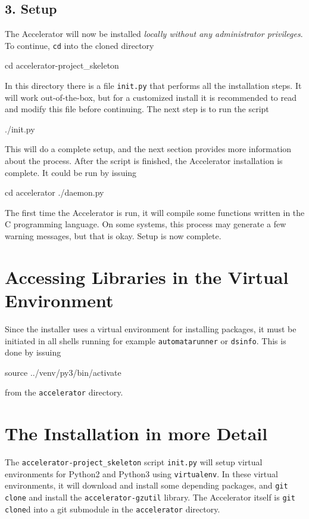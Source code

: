 \documentclass[a4paper]{article}
\begin{document}
\subsection*{3. Setup}
The Accelerator will now be installed \textsl{locally without any
  administrator privileges}.  To continue, \texttt{cd} into the cloned
directory
\begin{shell}
cd accelerator-project_skeleton
\end{shell}
In this directory there is a file \texttt{init.py} that performs all
the installation steps.  It will work out-of-the-box, but for a
customized install it is recommended to read and modify this file
before continuing.  The next step is to run the script
\begin{shell}
./init.py
\end{shell}
This will do a complete setup, and the next section provides more
information about the process.  After the script is finished, the
Accelerator installation is complete.  It could be run by issuing
\begin{shell}
cd accelerator
./daemon.py  
\end{shell}
The first time the Accelerator is run, it will compile some functions
written in the C programming language.  On some systems, this process
may generate a few warning messages, but that is okay.  Setup is now
complete.

\section*{Accessing Libraries in the Virtual Environment}
Since the installer uses a virtual environment for installing
packages, it must be initiated in all shells running for example
\texttt{automatarunner} or \texttt{dsinfo}.  This is done by issuing
\begin{shell}
source ../venv/py3/bin/activate
\end{shell}
from the \texttt{accelerator} directory.



\section*{The Installation in more Detail}
The \texttt{accelerator-project\_skeleton} script \texttt{init.py}
will setup virtual environments for Python2 and Python3 using
\texttt{virtualenv}.  In these virtual environments, it will download
and install some depending packages, and \texttt{git clone} and
install the \texttt{accelerator-gzutil} library.  The Accelerator
itself is \texttt{git clone}d into a git submodule in the
\texttt{accelerator} directory.
\end{document}

